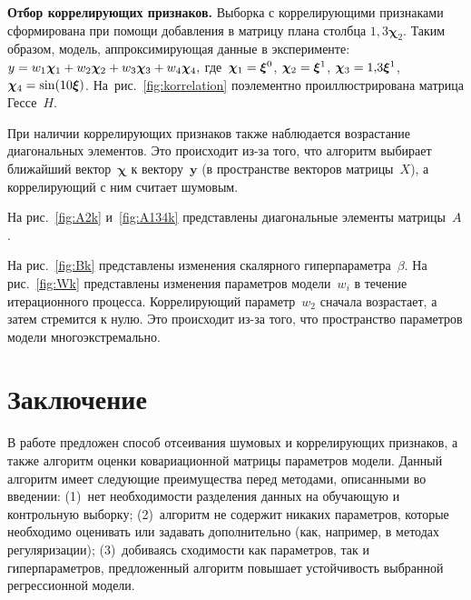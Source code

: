 \begin{multicols}{2}




\textbf{Отбор коррелирующих признаков.}
Выборка с коррелирующими признаками сформирована при помощи
добавления в матрицу плана столбца $1{,}3\boldsymbol{\chi}_2$. 
Таким
образом, модель, аппрок\-си\-ми\-ру\-ющая данные в эксперименте:
$y\hm=w_1\boldsymbol{\chi}_{1}\hm+w_2\boldsymbol{\chi}_{2}\hm+
w_3\boldsymbol{\chi}_{3}\hm+w_4\boldsymbol{\chi}_{4},$
где~$\boldsymbol{\chi}_1\hm=\boldsymbol{\xi}^0$,
$\boldsymbol{\chi}_2\hm=\boldsymbol{\xi}^1$,
$\boldsymbol{\chi}_3\hm=1{,}3\boldsymbol{\xi}^1$,
$\boldsymbol{\chi}_4\hm=\sin(10\boldsymbol{\xi})$.
На~рис.~\ref{fig:korrelation} поэлементно про\-ил\-люст\-ри\-ро\-ва\-на мат\-ри\-ца
Гессе~$H$.


При наличии коррелирующих признаков также наблюдается возрастание
диагональных элементов. Это происходит из-за того, что алгоритм
выбирает ближайший вектор~$\boldsymbol{\chi}$ к вектору~$\mathbf{y}$
(в пространстве векторов матрицы~$X$), а коррелирующий с ним считает
шумовым.

На рис.~\ref{fig:A2k} и~\ref{fig:A134k} 
представлены диагональные элементы матрицы~$A$.



На рис.~\ref{fig:Bk} представлены изменения скалярного
гиперпараметра~$\beta$. На рис.~\ref{fig:Wk} представлены изменения
параметров модели~$w_i$ в течение итерационного процесса.
Коррелирующий параметр~$w_2$ сначала возрастает, а затем стремится
к нулю. Это происходит из-за того, что пространство па\-ра\-мет\-ров
модели многоэкстремально.


\section{Заключение}

В работе предложен способ отсеивания шумовых и коррелирующих
признаков, а также алгоритм оценки ковариационной матрицы параметров
модели. Данный алгоритм имеет следующие преимущества  перед
методами, описанными во введении: (1)~нет необходимости разделения
данных на обуча\-ющую и контрольную выборку; (2)~алгоритм не содержит
никаких параметров, которые необходимо оценивать или задавать
дополнительно (как, например, в методах регуляризации); (3)~добиваясь
сходимости как параметров, так и ги\-пер\-па\-ра\-мет\-ров, предложенный
алгоритм повышает устойчивость выбранной регрессионной модели.


\end{multicols}
